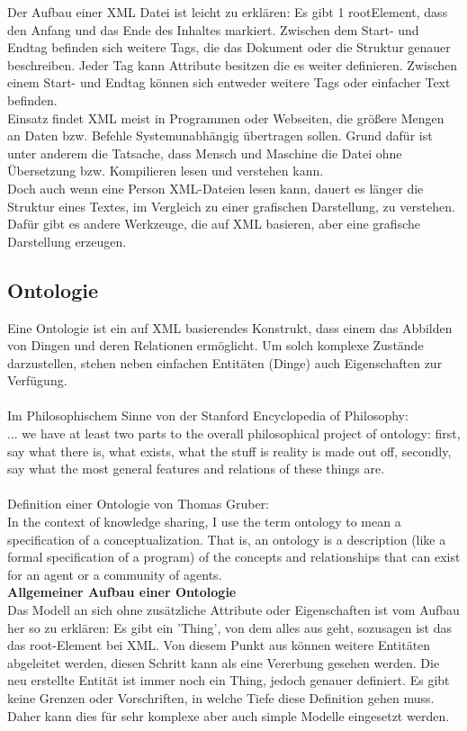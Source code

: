 Der Aufbau einer \ac{XML} Datei ist leicht zu erklären: Es gibt 1 rootElement, dass den Anfang und das Ende des Inhaltes markiert. Zwischen dem Start- und Endtag befinden sich weitere Tags, die das Dokument oder die Struktur genauer beschreiben. Jeder Tag kann Attribute besitzen die es weiter definieren. Zwischen einem Start- und Endtag können sich entweder weitere Tags oder einfacher Text befinden.
\\
Einsatz findet \ac{XML} meist in Programmen oder Webseiten, die größere Mengen an Daten bzw. Befehle Systemunabhängig übertragen sollen. Grund dafür ist unter anderem die Tatsache, dass Mensch und Maschine die Datei ohne Übersetzung bzw. Kompilieren lesen und verstehen kann.\\
Doch auch wenn eine Person \ac{XML}-Dateien lesen kann, dauert es länger die Struktur eines Textes, im Vergleich zu einer grafischen Darstellung, zu verstehen.\\  
Dafür gibt es andere Werkzeuge, die auf \ac{XML} basieren, aber eine grafische Darstellung erzeugen.
\subsection{Ontologie}
Eine Ontologie ist ein auf \ac{XML} basierendes Konstrukt, dass einem das Abbilden von Dingen und deren Relationen ermöglicht. Um solch komplexe Zustände darzustellen, stehen neben einfachen Entitäten (Dinge) auch Eigenschaften zur Verfügung.\\
\\
Im Philosophischem Sinne von der Stanford Encyclopedia of Philosophy:\\
\glqq ... we have at least two parts to the overall philosophical project of ontology: first, say what there is, what exists, what the stuff is reality is made out off, secondly, say what the most general features and relations of these things are.\grqq \cite{ontology_stanford} \\
\\
Definition einer Ontologie von Thomas Gruber:\\
\glqq In the context of knowledge sharing, I use the term ontology to mean a specification of a conceptualization. That is, an ontology is a description (like a formal specification of a program) of the concepts and relationships that can exist for an agent or a community of agents.\grqq \cite{onto_def}\\

\textbf{Allgemeiner Aufbau einer Ontologie}\\
Das Modell an sich ohne zusätzliche Attribute oder Eigenschaften ist vom Aufbau her so zu erklären: Es gibt ein 'Thing', von dem alles aus geht, sozusagen ist das das root-Element bei \ac{XML}. Von diesem Punkt aus können weitere Entitäten abgeleitet werden, diesen Schritt kann als eine Vererbung gesehen werden. Die neu erstellte Entität ist immer noch ein Thing, jedoch genauer definiert. Es gibt keine Grenzen oder Vorschriften, in welche Tiefe diese Definition gehen muss. Daher kann dies für sehr komplexe aber auch simple Modelle eingesetzt werden.\\

